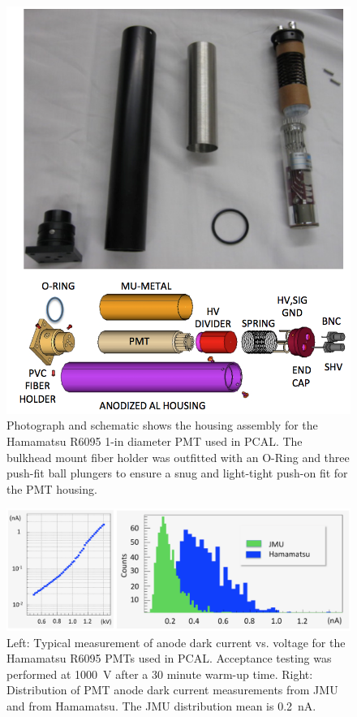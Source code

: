 \begin{figure}[hbt]
\centering
\includegraphics[width=0.85\columnwidth,keepaspectratio]{img/S4_PMT.png}
\caption{Photograph and schematic shows the housing assembly for the Hamamatsu R6095 1-in diameter PMT
  used in PCAL.  The bulkhead mount fiber holder was outfitted with an O-Ring and three push-fit ball plungers to
  ensure a snug and light-tight push-on fit for the PMT housing.}
\label{fig:S4_PMT}
\end{figure}

\begin{figure}[hbt]
\centering
\includegraphics[width=1.0\columnwidth,keepaspectratio]{img/S4_PMT_2.png}
\caption{Left: Typical measurement of anode dark current vs. voltage for the Hamamatsu R6095 PMTs used in
  PCAL. Acceptance testing was performed at 1000~V after a 30 minute warm-up time. Right: Distribution of PMT
  anode dark current measurements from JMU and from Hamamatsu. The JMU distribution mean is 0.2~nA.}
\label{fig:S4_PMT_2}
\end{figure}

